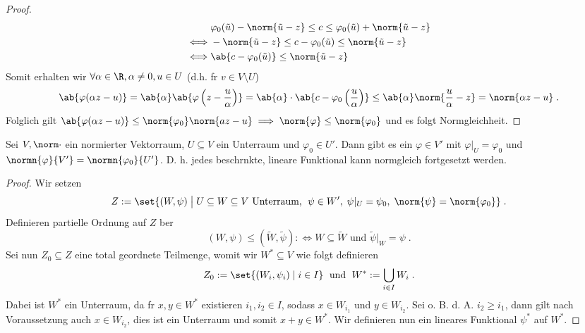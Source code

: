 \begin{proof}
\begin{align*}
			& \varphi_0(\tilde u) - \norm{\tilde u - z} \leq c \leq \varphi_0 (\tilde u) + \norm{\tilde u -z} \\
			\iff & 	- \norm{\tilde u - z} \leq c - \varphi_0 (\tilde u) \leq \norm{\tilde u -z}	
			\\
			\iff & \ab{c-\varphi_0(\tilde u)} \leq \norm{\tilde u -z}
			\end{align*}
			Somit erhalten wir \(\forall \alpha \in \R, \alpha \neq 0, u \in U\) (d.h. f\us r \(v\in V\setminus U\))
			\[\ab{\varphi(\alpha z -u)} = \ab{\alpha} \ab{\varphi\left(z - \frac{u}{\alpha}\right)} = \ab{\alpha} \cdot \ab{c - \varphi_0\left(\frac{u}{\alpha}\right)} \leq \ab{\alpha}\norm{\frac{u}{\alpha}-z} = \norm{\alpha z -u}\;.\]
			Folglich gilt 
			\(\ab{\varphi(\alpha z -u)} \leq \norm{\varphi_0} \norm{az - u}\implies \norm{\varphi} \leq \norm{\varphi_0}\) und es folgt Normgleichheit.
	\end{proof}
	
\begin{theorem}
	Sei \(V,\norm\cdot\) ein normierter Vektorraum, \(U\subseteq V\) ein Unterraum und \(\varphi_0 \in U'\). Dann gibt es ein \(\varphi \in V'\) mit \(\varphi\vert_U = \varphi_0\) und \(\normn{\varphi}{V'} = \normn{\varphi_0}{U'}\). D. h. jedes beschr\as nkte, lineare Funktional kann normgleich fortgesetzt werden. 
\end{theorem}
\begin{proof}
	Wir setzen 
	\[Z := \set{(W,\psi)\;\big\vert\; U\subseteq W \subseteq V \text{ Unterraum, }\;\psi \in W',\; \psi\vert_U = \psi_0,\; \norm{\psi} = \norm{\varphi_0}}\;.\]
	Definieren partielle Ordnung auf $Z$ \us ber
	\[(W,\psi) \leq (\tilde W, \tilde \psi) : \iff W \subseteq \tilde W \text{ und } \tilde\psi \vert_W = \psi\;.\]
	Sei nun $Z_0\subseteq Z$ eine total geordnete Teilmenge, womit wir $W^*\subseteq V$ wie folgt definieren
	\[Z_0 := \set{(W_i,\psi_i)\;\vert\; i \in I}\;\text{ und }\; W^* := \bigcup_{i\in I} W_i\;.\]
	Dabei ist $W^*$ ein Unterraum, da f\us r \(x,y \in W^*\) existieren \(i_1, i_2 \in I\), sodass \(x \in W_{i_1}\) und \(y\in W_{i_2}\). Sei o. B. d. A. \(i_2 \geq i_1\), dann gilt nach Voraussetzung auch \(x\in W_{i_2}\), dies ist ein Unterraum und somit \(x+y \in W^*\). Wir definieren nun ein lineares Funktional \(\psi^*\) auf \(W^*\).
	
\end{proof}